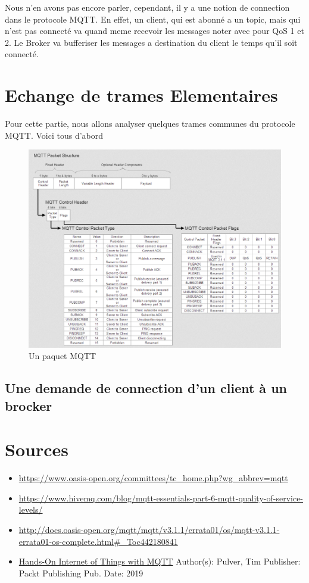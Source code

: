\documentclass[a4paper,10pt]{article}
\begin{document}
Nous n'en avons pas encore parler, cependant, il y a une notion de connection dans le protocole MQTT. En effet, un client, qui est abonné a un topic, mais qui n'est pas connecté va quand meme recevoir les messages noter avec pour QoS 1 et 2. Le Broker va bufferiser les messages a destination du client le temps qu'il soit connecté.


\section{Echange de trames Elementaires}

Pour cette partie, nous allons analyser quelques trames  communes du protocole MQTT.
Voici tous d'abord

\begin{figure}[h!]
\centering
\includegraphics[scale=0.350]{paquet.jpg}
\caption{Un paquet MQTT}
\label{fig:paquet}
\end{figure}
\subsection{Une demande de connection d'un client à un brocker}




 \section{Sources}

\begin{itemize}
 \item \url{https://www.oasis-open.org/committees/tc_home.php?wg_abbrev=mqtt}
 \item \url{https://www.hivemq.com/blog/mqtt-essentials-part-6-mqtt-quality-of-service-levels/}
 \item \url{http://docs.oasis-open.org/mqtt/mqtt/v3.1.1/errata01/os/mqtt-v3.1.1-errata01-os-complete.html#_Toc442180841}
 \item \underline{Hands-On Internet of Things with MQTT} Author(s): Pulver, Tim Publisher: Packt Publishing Pub. Date: 2019
\end{itemize}
\end{document}
